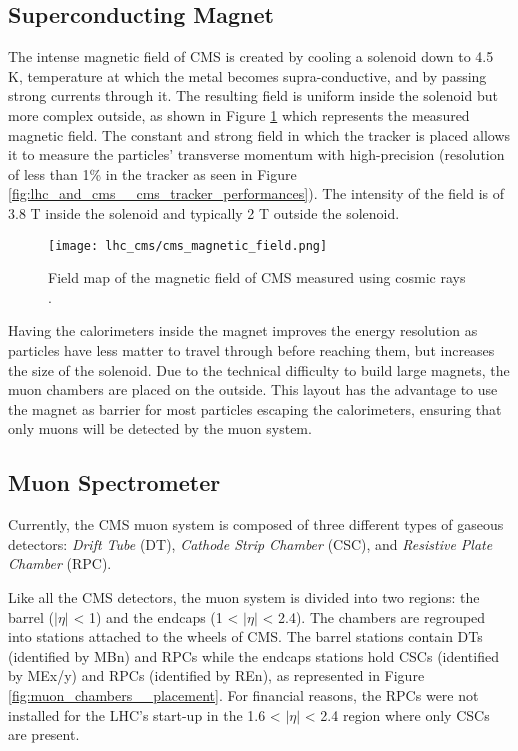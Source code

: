         \subsection{Superconducting Magnet}

            The intense magnetic field of CMS is created by cooling a solenoid down to 4.5 K, temperature at which the metal becomes supra-conductive, and by passing strong currents through it. The resulting field is uniform inside the solenoid but more complex outside, as shown in Figure \ref{fig:lhc_and_cms__cms_magnetic_field} which represents the measured magnetic field. The constant and strong field in which the tracker is placed allows it to measure the particles' transverse momentum with high-precision (resolution of less than 1\% in the tracker as seen in Figure \ref{fig:lhc_and_cms__cms_tracker_performances}). The intensity of the field is of 3.8 T inside the solenoid and typically 2 T outside the solenoid. \\

            \begin{figure}[h!]
                \centering
                \texttt{[image: lhc\_cms/cms\_magnetic\_field.png]}
                \caption{Field map of the magnetic field of CMS measured using cosmic rays \Cite{CMS_B_Field}.}
                \label{fig:lhc_and_cms__cms_magnetic_field}
            \end{figure} 

            Having the calorimeters inside the magnet improves the energy resolution as particles have less matter to travel through before reaching them, but increases the size of the solenoid. Due to the technical difficulty to build large magnets, the muon chambers are placed on the outside. This layout has the advantage to use the magnet as barrier for most particles escaping the calorimeters, ensuring that only muons will be detected by the muon system.

        \subsection{Muon Spectrometer}

            Currently, the CMS muon system \Cite{CMS_at_LHC, CMS_Performances} is composed of three different types of gaseous detectors: \emph{Drift Tube} (DT), \emph{Cathode Strip Chamber} (CSC), and \emph{Resistive Plate Chamber} (RPC).

            Like all the CMS detectors, the muon system is divided into two regions: the barrel ($ | \eta | $ < 1) and the endcaps (1 < $ | \eta | $ < 2.4). The chambers are regrouped into stations attached to the wheels of CMS. The barrel stations contain DTs (identified by MBn) and RPCs while the endcaps stations hold CSCs (identified by MEx/y) and RPCs (identified by REn), as represented in Figure \ref{fig:muon_chambers__placement}. For financial reasons, the RPCs were not installed for the LHC's start-up in the 1.6 < $ | \eta | $ < 2.4 region where only CSCs are present. 

